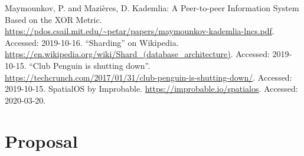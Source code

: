 \documentclass[10pt,twoside,notitlepage,a4paper]{report}
\begin{document}
	\cleardoublepage
	
	\begin{thebibliography}{9}
		 Maymounkov, P. and Mazières, D. Kademlia: A Peer-to-peer Information System Based on the XOR Metric. \url{https://pdos.csail.mit.edu/~petar/papers/maymounkov-kademlia-lncs.pdf}. Accessed: 2019-10-16.
		 ``Sharding'' on Wikipedia. \url{https://en.wikipedia.org/wiki/Shard_(database_architecture)}. Accessed: 2019-10-15.
		 ``Club Penguin is shutting down''. \url{https://techcrunch.com/2017/01/31/club-penguin-is-shutting-down/}. Accessed: 2019-10-15.
		 SpatialOS by Improbable. \url{https://improbable.io/spatialos}. Accessed: 2020-03-20.
	\end{thebibliography}
	\cleardoublepage
	
	\appendix
	
	\chapter{Proposal}
	
\end{document}
